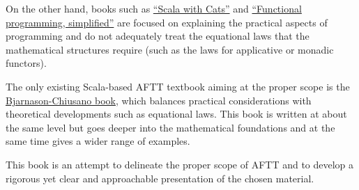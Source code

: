 On the other hand, books such as \href{https://underscore.io/books/scala-with-cats/}{“Scala with Cats”}
and \href{https://alvinalexander.com/scala/functional-programming-simplified-book}{“Functional programming, simplified”}
are focused on explaining the practical aspects of programming and
do not adequately treat the equational laws that the mathematical
structures require (such as the laws for applicative or monadic functors).

The only existing Scala-based AFTT textbook aiming at the proper scope
is the \href{https://www.manning.com/books/functional-programming-in-scala}{Bjarnason-Chiusano book},
which balances practical considerations with theoretical developments
such as equational laws. This book is written at about the same level
but goes deeper into the mathematical foundations and at the same
time gives a wider range of examples.

This book is an attempt to delineate the proper scope of AFTT and
to develop a rigorous yet clear and approachable presentation of the
chosen material. 
